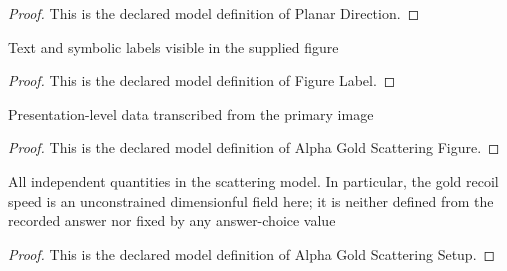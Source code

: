 \begin{proof}
  This is the declared model definition of Planar Direction.
\end{proof}
\begin{definition}
  \label{def:physics:phyx-mini-0641:phyxminiproblems-problemphyxmini0641-figurelabel}
  Text and symbolic labels visible in the supplied figure
\end{definition}
\begin{proof}
  This is the declared model definition of Figure Label.
\end{proof}
\begin{definition}
  \label{def:physics:phyx-mini-0641:phyxminiproblems-problemphyxmini0641-alphagoldscatteringfigure}
  Presentation-level data transcribed from the primary image
\end{definition}
\begin{proof}
  This is the declared model definition of Alpha Gold Scattering Figure.
\end{proof}
\begin{definition}
  \label{def:physics:phyx-mini-0641:phyxminiproblems-problemphyxmini0641-alphagoldscatteringsetup}
  All independent quantities in the scattering model. In particular, the gold recoil speed is an unconstrained dimensionful field here; it is neither defined from the recorded answer nor fixed by any answer-choice value
\end{definition}
\begin{proof}
  This is the declared model definition of Alpha Gold Scattering Setup.
\end{proof}
